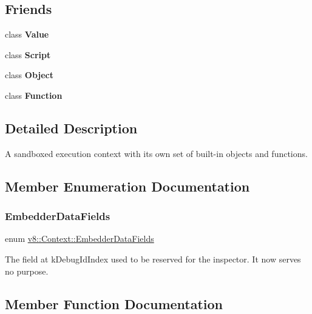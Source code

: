 \subsection*{Friends}
\begin{DoxyCompactItemize}
\item 
\mbox{\label{classv8_1_1Context_aeceedf6e1a7d48a588516ce2b1983d6f}} 
class {\bfseries Value}
\item 
\mbox{\label{classv8_1_1Context_ae98eaa96d1b24e087f3c3e372fb09dce}} 
class {\bfseries Script}
\item 
\mbox{\label{classv8_1_1Context_a0720b5f434e636e22a3ed34f847eec57}} 
class {\bfseries Object}
\item 
\mbox{\label{classv8_1_1Context_ab7194606aa12931e96f8f5448d418ed0}} 
class {\bfseries Function}
\end{DoxyCompactItemize}


\subsection{Detailed Description}
A sandboxed execution context with its own set of built-\/in objects and functions. 

\subsection{Member Enumeration Documentation}
\mbox{\label{classv8_1_1Context_a8e8a8c567e2d193f25f1ec211db0b5f9}} 
\subsubsection{\texorpdfstring{Embedder\+Data\+Fields}{EmbedderDataFields}}
{\footnotesize\ttfamily enum \mbox{\hyperlink{classv8_1_1Context_a8e8a8c567e2d193f25f1ec211db0b5f9}{v8\+::\+Context\+::\+Embedder\+Data\+Fields}}}

The field at k\+Debug\+Id\+Index used to be reserved for the inspector. It now serves no purpose. 

\subsection{Member Function Documentation}
\mbox{\label{classv8_1_1Context_a794ccc42113566f5d363f89c8b0d3c2c}} 
